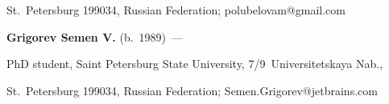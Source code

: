 St.\ Petersburg 199034, Russian Federation; \mbox{polubelovam@gmail.com}





\vspace*{3pt}





\noindent


\textbf{Grigorev Semen V.} (b.\ 1989)~---


PhD student, Saint Petersburg State University,  7/9~Universitetskaya Nab., 


St.\ Petersburg 199034, Russian Federation; Semen.Grigorev@jetbrains.com 





\label{end\stat}








\renewcommand{\bibname}{\protect\rm Литература}



